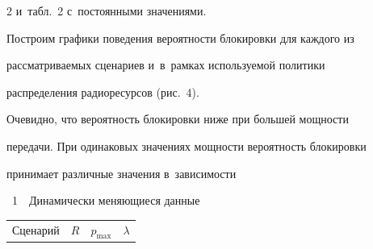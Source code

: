 \begin{multicols}{2}
и~табл.~2 с~постоянными значениями.


  


  











  


  Построим графики поведения вероятности блокировки для каждого из 


рассматриваемых сценариев и~в~рамках используемой политики 


распределения радиоресурсов (рис.~4). 








  


  Очевидно, что вероятность блокировки ниже при большей мощности 


передачи. При одинаковых значениях мощности вероятность блокировки 


принимает различные значения в~зависимости\linebreak\vspace*{-12pt}









  \begin{center}


  \vspace*{6pt}


  


{{\tablename~1}\ \ \small{Динамически меняющиеся данные}}








  \vspace*{2ex}


{\small  


  \tabcolsep=4.5pt


  \begin{tabular}{|c|c|c|c|}


  \hline


Сценарий&$R$ & $p_{\max}$& $\lambda$\\



\end{tabular}}
\end{center}
\end{multicols}
